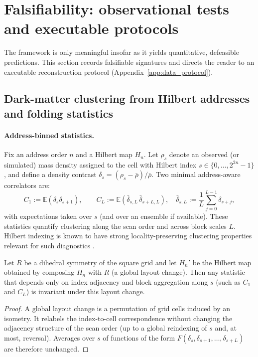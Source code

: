 
\section{Falsifiability: observational tests and executable protocols}
\label{sec:falsifiability}

The framework is only meaningful insofar as it yields quantitative, defeasible predictions.
This section records falsifiable signatures and directs the reader to an executable reconstruction protocol (Appendix~\ref{app:data_protocol}).

\subsection{Dark-matter clustering from Hilbert addresses and folding statistics}
\label{subsec:test_dm_clustering}

\paragraph{Address-binned statistics.}
Fix an address order $n$ and a Hilbert map $H_n$.
Let $\rho_s$ denote an observed (or simulated) mass density assigned to the cell with Hilbert index $s\in\{0,\dots,2^{2n}-1\}$, and define a density contrast $\delta_s=(\rho_s-\bar\rho)/\bar\rho$.
Two minimal address-aware correlators are:
\[
C_1:=\mathbb{E}(\delta_s\delta_{s+1}),
\qquad
C_L:=\mathbb{E}\!\left(\bar{\delta}_{s,L}\,\bar{\delta}_{s+L,L}\right),
\quad
\bar{\delta}_{s,L}:=\frac{1}{L}\sum_{j=0}^{L-1}\delta_{s+j},
\]
with expectations taken over $s$ (and over an ensemble if available).
These statistics quantify clustering along the scan order and across block scales $L$.
Hilbert indexing is known to have strong locality-preserving clustering properties relevant for such diagnostics \cite{MoonJagadishFaloutsosSaltz2001}.

\begin{lemma}
\label{lem:layout_invariance}
Let $R$ be a dihedral symmetry of the square grid and let $H_n'$ be the Hilbert map obtained by composing $H_n$ with $R$ (a global layout change).
Then any statistic that depends only on index adjacency and block aggregation along $s$ (such as $C_1$ and $C_L$) is invariant under this layout change.
\end{lemma}

\begin{proof}
A global layout change is a permutation of grid cells induced by an isometry.
It relabels the index-to-cell correspondence without changing the adjacency structure of the scan order (up to a global reindexing of $s$ and, at most, reversal).
Averages over $s$ of functions of the form $F(\delta_s,\delta_{s+1},\dots,\delta_{s+L})$ are therefore unchanged.
\end{proof}

